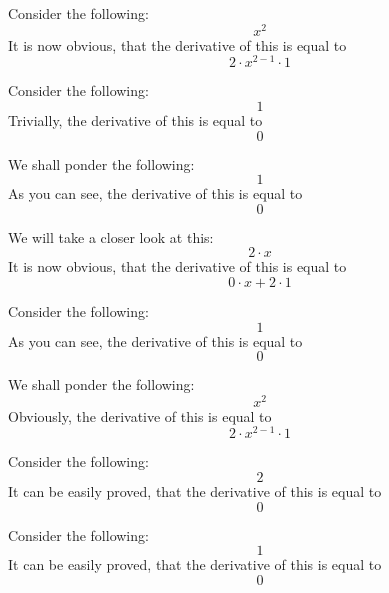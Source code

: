\documentclass{article}
\begin{document}
Consider the following:
\begin{equation}
x ^{2 } 
\end{equation}
It is now obvious, that the derivative of this is equal to
\begin{equation}
2 \cdot x ^{2 - 1 } \cdot 1 
\end{equation}

Consider the following:
\begin{equation}
1 
\end{equation}
Trivially, the derivative of this is equal to
\begin{equation}
0 
\end{equation}

We shall ponder the following:
\begin{equation}
1 
\end{equation}
As you can see, the derivative of this is equal to
\begin{equation}
0 
\end{equation}

We will take a closer look at this:
\begin{equation}
2 \cdot x 
\end{equation}
It is now obvious, that the derivative of this is equal to
\begin{equation}
0 \cdot x + 2 \cdot 1 
\end{equation}

Consider the following:
\begin{equation}
1 
\end{equation}
As you can see, the derivative of this is equal to
\begin{equation}
0 
\end{equation}

We shall ponder the following:
\begin{equation}
x ^{2 } 
\end{equation}
Obviously, the derivative of this is equal to
\begin{equation}
2 \cdot x ^{2 - 1 } \cdot 1 
\end{equation}

Consider the following:
\begin{equation}
2 
\end{equation}
It can be easily proved, that the derivative of this is equal to
\begin{equation}
0 
\end{equation}

Consider the following:
\begin{equation}
1 
\end{equation}
It can be easily proved, that the derivative of this is equal to
\begin{equation}
0 
\end{equation}
\end{document}
